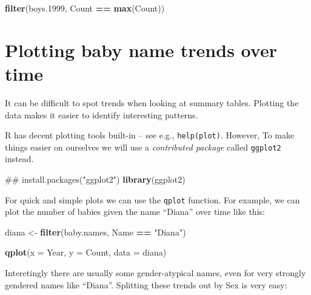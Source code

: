 \documentclass[]{book}
\newenvironment{Shaded}{\begin{snugshade}}{\end{snugshade}}
\newcommand{\KeywordTok}[1]{\textcolor[rgb]{0.13,0.29,0.53}{\textbf{#1}}}
\newcommand{\DataTypeTok}[1]{\textcolor[rgb]{0.13,0.29,0.53}{#1}}
\newcommand{\DecValTok}[1]{\textcolor[rgb]{0.00,0.00,0.81}{#1}}
\newcommand{\StringTok}[1]{\textcolor[rgb]{0.31,0.60,0.02}{#1}}
\newcommand{\OperatorTok}[1]{\textcolor[rgb]{0.81,0.36,0.00}{\textbf{#1}}}
\newcommand{\NormalTok}[1]{#1}
\begin{document}
\begin{Shaded}
\begin{Highlighting}[]
\KeywordTok{filter}\NormalTok{(boys.}\DecValTok{1999}\NormalTok{, Count }\OperatorTok{==}\StringTok{ }\KeywordTok{max}\NormalTok{(Count))}
\end{Highlighting}
\end{Shaded}

\chapter{Plotting baby name trends over
time}\label{plotting-baby-name-trends-over-time}

It can be difficult to spot trends when looking at summary tables.
Plotting the data makes it easier to identify interesting patterns.

R has decent plotting tools built-in -- see e.g., \texttt{help(plot)}.
However, To make things easier on ourselves we will use a
\emph{contributed package} called \texttt{ggplot2} instead.

\begin{Shaded}
\begin{Highlighting}[]
\NormalTok{## install.packages("ggplot2")}
\KeywordTok{library}\NormalTok{(ggplot2)}
\end{Highlighting}
\end{Shaded}

For quick and simple plots we can use the \texttt{qplot} function. For
example, we can plot the number of babies given the name ``Diana'' over
time like this:

\begin{Shaded}
\begin{Highlighting}[]
\NormalTok{diana <-}\StringTok{ }\KeywordTok{filter}\NormalTok{(baby.names, Name }\OperatorTok{==}\StringTok{ "Diana"}\NormalTok{)}
\end{Highlighting}
\end{Shaded}

\begin{Shaded}
\begin{Highlighting}[]
\KeywordTok{qplot}\NormalTok{(}\DataTypeTok{x =}\NormalTok{ Year, }\DataTypeTok{y =}\NormalTok{ Count,}
     \DataTypeTok{data =}\NormalTok{ diana)}
\end{Highlighting}
\end{Shaded}

Interetingly there are usually some gender-atypical names, even for very
strongly gendered names like ``Diana''. Splitting these trends out by
Sex is very easy:
\end{document}
